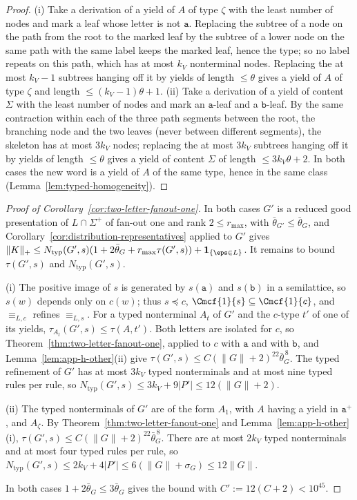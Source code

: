 \begin{proof}
(i) Take a derivation of a yield of $A$ of type $\zeta$ with the least number of
nodes and mark a leaf whose letter is not $\mathtt a$.  Replacing the subtree of a
node on the path from the root to the marked leaf by the subtree of a lower node
on the same path with the same label keeps the marked leaf, hence the type; so no label repeats on
this path, which has at most $k_V$ nonterminal nodes.  Replacing the at most
$k_V-1$ subtrees hanging off it by yields of length $\le\theta$ gives a yield of
$A$ of type $\zeta$ and length $\le(k_V-1)\theta+1$.  (ii) Take a derivation of a
yield of content $\Sigma$ with the least number of nodes and mark an $\mathtt
a$-leaf and a $\mathtt b$-leaf.  By the same contraction within each of the three
path segments between the root, the branching node and the two leaves (never
between different segments), the skeleton has at most
$3k_V$ nodes; replacing the at most $3k_V$ subtrees hanging off it by yields of
length $\le\theta$ gives a yield of content $\Sigma$ of length $\le3k_V\theta+2$.
In both cases the new word is a yield of $A$ of the same type, hence in the same
class (Lemma~\ref{lem:typed-homogeneity}).
\end{proof}

\begin{proof}[Proof of Corollary~\ref{cor:two-letter-fanout-one}]
In both cases $G'$ is a reduced good presentation of $L\cap\Sigma^+$ of fan-out
one and rank $2\le r_{\max}$, with $\bar\theta_{G'}\le\bar\theta_G$, and
Corollary~\ref{cor:distribution-representatives} applied to $G'$ gives
$\|K\|_+\le N_{\mathrm{typ}}(G',s)(1+2\bar\theta_G+r_{\max}\tau(G',s))
+\mathbf 1_{\{\eps\in L\}}$.  It remains to bound $\tau(G',s)$ and
$N_{\mathrm{typ}}(G',s)$.

(i) The positive image of $s$ is generated by $s(\mathtt a)$ and $s(\mathtt b)$ in a
semilattice, so $s(w)$ depends only on $c(w)$; thus $s\preceq c$,
$\Cmcf{1}{s}\subseteq\Cmcf{1}{c}$, and $\equiv_{L,c}$ refines $\equiv_{L,s}$.
For a typed nonterminal $A_t$ of $G'$ and the $c$-type $t'$ of one of its
yields, $\tau_{A_t}(G',s)\le\tau(A,t')$.  Both letters are isolated for $c$, so
Theorem~\ref{thm:two-letter-fanout-one}, applied to $c$ with $\mathtt a$ and with
$\mathtt b$, and Lemma~\ref{lem:app-h-other}(ii) give
$\tau(G',s)\le C(\|G\|+2)^{22}\bar\theta_G^{\,8}$.  The typed refinement of $G'$
has at most $3k_V$ typed nonterminals and at most nine typed rules per rule, so
$N_{\mathrm{typ}}(G',s)\le3k_V+9|P'|\le12(\|G\|+2)$.

(ii) The typed nonterminals of $G'$ are of the form $A_1$, with $A$ having a
yield in $\mathtt a^+$, and $A_\zeta$.  By
Theorem~\ref{thm:two-letter-fanout-one} and Lemma~\ref{lem:app-h-other}(i),
$\tau(G',s)\le C(\|G\|+2)^{22}\bar\theta_G^{\,8}$.  There are at most $2k_V$ typed
nonterminals and at most four typed rules per rule, so
$N_{\mathrm{typ}}(G',s)\le2k_V+4|P'|\le6(\|G\|+\sigma_G)\le12\|G\|$.

In both cases $1+2\bar\theta_G\le3\bar\theta_G$ gives the bound with
$C':=12(C+2)<10^{45}$.
\end{proof}

